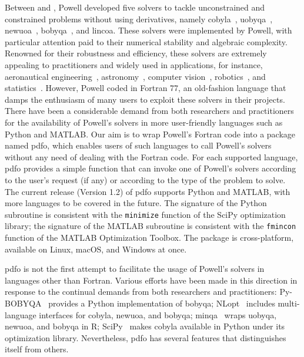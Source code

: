\documentclass[11pt,draft]{article}
\numberwithin{equation}{section}
\begin{document}
Between \citeyear{Powell_1994} and \citeyear{Powell_2015}, Powell developed five solvers to tackle unconstrained and constrained problems without using derivatives,
namely \gls{cobyla}~\cite{Powell_1994}, \gls{uobyqa}~\cite{Powell_2002}, \gls{newuoa}~\cite{Powell_2006}, \gls{bobyqa}~\cite{Powell_2009}, and \gls{lincoa}.
These solvers were implemented by Powell, with particular attention paid to their numerical stability and algebraic complexity.
Renowned for their robustness and efficiency, these solvers are extremely appealing to practitioners and widely used in applications, for instance, aeronautical engineering~\cite{Gallard_Etal_2018}, astronomy~\cite{Biviano_Etal_2013,Mamon_Biviano_Boue_2013}, computer vision~\cite{Izadinia_Shan_Seitz_2017}, robotics~\cite{Mombaur_Truong_Laumond_2010}, and statistics~\cite{Bates_Etal_2015}.
However, Powell coded in Fortran 77, an old-fashion language that damps the enthusiasm of many users to exploit these solvers in their projects.
There have been a considerable demand from both researchers and practitioners for the availability of Powell's solvers in more user-friendly languages such as Python and MATLAB.
Our aim is to wrap Powell's Fortran code into a package named \gls{pdfo}, which enables users of such languages to call Powell's solvers without any need of dealing with the Fortran code.
For each supported language, \gls{pdfo} provides a simple function that can invoke one of Powell's solvers according to the user's request (if any) or according to the type of the problem to solve. The current release (Version 1.2) of \gls{pdfo} supports Python and MATLAB, with more languages to be covered in the future.
The signature of the Python subroutine is consistent with the \texttt{minimize} function of the SciPy optimization library; the signature of the MATLAB subroutine is consistent with the \texttt{fmincon} function of the MATLAB Optimization Toolbox.
The package is cross-platform, available on Linux, macOS, and Windows at once.

\gls{pdfo} is not the first attempt to facilitate the usage of Powell's solvers in languages other than Fortran.
Various efforts have been made in this direction in response to the continual demands from both researchers and practitioners: Py-BOBYQA~\cite{Cartis_Etal_2019} provides a Python implementation of \gls{bobyqa}; NLopt~\cite{Johnson_2019} includes multi-language interfaces for \gls{cobyla}, \gls{newuoa}, and \gls{bobyqa}; minqa~\cite{Bates_Etal_2014} wraps \gls{uobyqa}, \gls{newuoa}, and \gls{bobyqa} in R; SciPy~\cite{Virtanen_Etal_2020} makes \gls{cobyla} available in Python under its optimization library. Nevertheless, \gls{pdfo} has several features that distinguishes itself from others.
\end{document}

